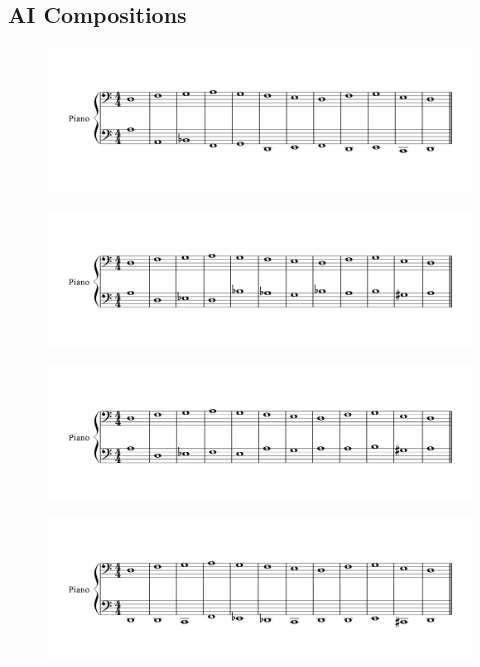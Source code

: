 \subsection{AI Compositions}
\begin{figure}[h!]
  \includegraphics[width=5in]{example-composition-images/1-1.png}
\end{figure}
\begin{figure}[h!]
  \includegraphics[width=5in]{example-composition-images/2-1.png}
\end{figure}
\begin{figure}[h!]
  \includegraphics[width=5in]{example-composition-images/3-1.png}
\end{figure}
\begin{figure}[h!]
  \includegraphics[width=5in]{example-composition-images/4-1.png}
\end{figure}
